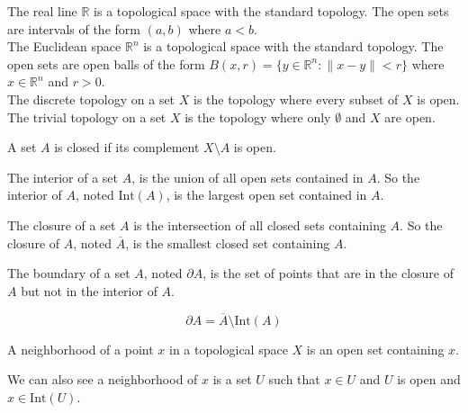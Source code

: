 \documentclass{article}
\begin{document}
\begin{example}
    The real line \(\mathbb{R} \) is a topological space with the standard topology.
    The open sets are intervals of the form \((a, b) \) where \(a < b \).\\

    The Euclidean space \(\mathbb{R}^n \) is a topological space with the standard topology. The open sets are open balls of the form \(B(x, r) = \{y \in \mathbb{R}^n : \|x - y\| < r \} \) where \(x \in \mathbb{R}^n \) and \(r > 0 \).\\

    The discrete topology on a set \(X \) is the topology where every subset of \(X \) is open.\\

    The trivial topology on a set \(X \) is the topology where only \(\emptyset \) and \(X \) are open.


\end{example}

\begin{definition}
    A set $A$ is closed if its complement $X \setminus A$ is open.
\end{definition}

\begin{definition}[Interior]
    The interior of a set $A$, is the union of all open sets contained in $A$.
    So the interior of $A$, noted $\text{Int}(A)$, is the largest open set contained in $A$.
\end{definition}

\begin{definition}[Closure]
    The closure of a set $A$ is the intersection of all closed sets containing $A$.
    So the closure of $A$, noted $\overline{A}$, is the smallest closed set containing $A$.
\end{definition}

\begin{definition}[Boundary]
    The boundary of a set $A$, noted $\partial A$, is the set of points that are in the closure of $A$ but not in the interior of $A$.

    \[
        \partial A = \overline{A} \setminus \text{Int}(A)
    \]

\end{definition}


\begin{definition}[Neighborhood]
    A neighborhood of a point $x$ in a topological space $X$ is an open set containing $x$.

    We can also see a neighborhood of $x$ is a set $U$ such that $x \in U$ and $U$ is open and $x \in \text{Int}(U)$.
\end{definition}
\end{document}
